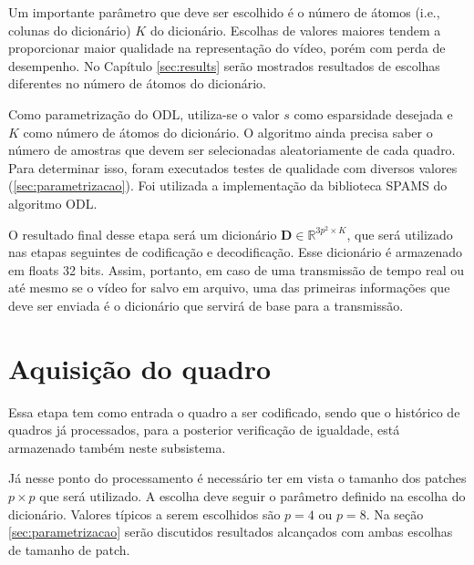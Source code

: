 \documentclass[cic,tc]{iiufrgs}
\newcommand{\mat}[1]{\bm{#1}}
\begin{document}
Um importante parâmetro que deve ser escolhido é o número de átomos (i.e., colunas do dicionário) $K$ do dicionário.
Escolhas de valores maiores tendem a proporcionar maior qualidade na representação do vídeo,
porém com perda de desempenho. No Capítulo \ref{sec:results} serão mostrados resultados
de escolhas diferentes no número de átomos do dicionário.

Como parametrização do ODL, utiliza-se o valor $s$ como esparsidade desejada e
$K$ como número de átomos do dicionário.
O algoritmo ainda precisa saber o número de amostras que devem ser selecionadas aleatoriamente
de cada quadro.
Para determinar isso, foram executados testes de qualidade com diversos valores
(\autoref{sec:parametrizacao}).
Foi utilizada a implementação da biblioteca SPAMS \cite{SPAMS} do algoritmo ODL.

O resultado final desse etapa será um dicionário $\mat{D} \in \mathbb{R}^{3p^2 \times K}$,
que será utilizado nas etapas seguintes de codificação e decodificação.
Esse dicionário é armazenado em floats 32 bits.
Assim, portanto, em caso de uma transmissão de tempo real ou até mesmo se o vídeo for salvo em arquivo,
uma das primeiras informações que deve ser enviada é o dicionário que servirá de base
para a transmissão.


\section{Aquisição do quadro}
\label{sec:quadroaquisition}
Essa etapa tem como entrada o quadro a ser codificado, sendo que o histórico de quadros já
processados, para a posterior verificação de igualdade, está armazenado também neste
subsistema.

Já nesse ponto do processamento é necessário ter em vista o tamanho dos patches $p\times p$
que será utilizado. A escolha deve seguir o parâmetro definido na escolha do dicionário.
Valores típicos a serem escolhidos são $p=4$ ou $p=8$. Na seção \ref{sec:parametrizacao} serão 
discutidos resultados alcançados com ambas escolhas de tamanho de patch.
\end{document}
